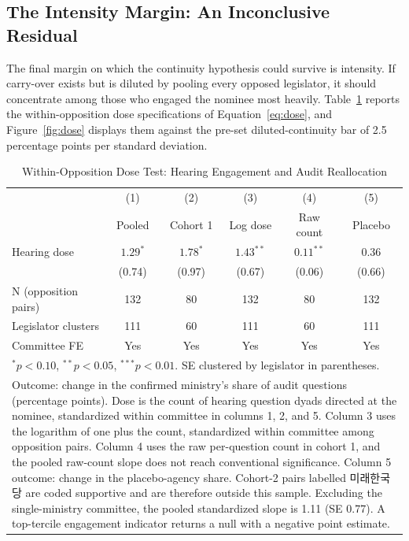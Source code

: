 \documentclass[11pt]{article}
\begin{document}
\subsection{The Intensity Margin: An Inconclusive Residual}

The final margin on which the continuity hypothesis could survive is intensity. If carry-over exists but is diluted by pooling every opposed legislator, it should concentrate among those who engaged the nominee most heavily. Table~\ref{tab:dose} reports the within-opposition dose specifications of Equation~\ref{eq:dose}, and Figure~\ref{fig:dose} displays them against the pre-set diluted-continuity bar of 2.5 percentage points per standard deviation.

\begin{table}[!htbp]
\centering
\caption{Within-Opposition Dose Test: Hearing Engagement and Audit Reallocation}
\label{tab:dose}
\begin{tabular}{lccccc}
\toprule
& (1) & (2) & (3) & (4) & (5) \\
& Pooled & Cohort 1 & Log dose & Raw count & Placebo \\
\midrule
Hearing dose & $1.29^{*}$ & $1.78^{*}$ & $1.43^{**}$ & $0.11^{**}$ & $0.36$ \\
& (0.74) & (0.97) & (0.67) & (0.06) & (0.66) \\
\midrule
N (opposition pairs) & 132 & 80 & 132 & 80 & 132 \\
Legislator clusters & 111 & 60 & 111 & 60 & 111 \\
Committee FE & Yes & Yes & Yes & Yes & Yes \\
\bottomrule
\multicolumn{6}{l}{\footnotesize $^{*}p<0.10$, $^{**}p<0.05$, $^{***}p<0.01$. SE clustered by legislator in parentheses.} \\
\multicolumn{6}{l}{\footnotesize \parbox{0.94\textwidth}{Outcome: change in the confirmed ministry's share of audit questions (percentage points). Dose is the count of hearing question dyads directed at the nominee, standardized within committee in columns 1, 2, and 5. Column 3 uses the logarithm of one plus the count, standardized within committee among opposition pairs. Column 4 uses the raw per-question count in cohort 1, and the pooled raw-count slope does not reach conventional significance. Column 5 outcome: change in the placebo-agency share. Cohort-2 pairs labelled 미래한국당 are coded supportive and are therefore outside this sample. Excluding the single-ministry committee, the pooled standardized slope is 1.11 (SE 0.77). A top-tercile engagement indicator returns a null with a negative point estimate.}} \\
\end{tabular}
\end{table}
\end{document}
